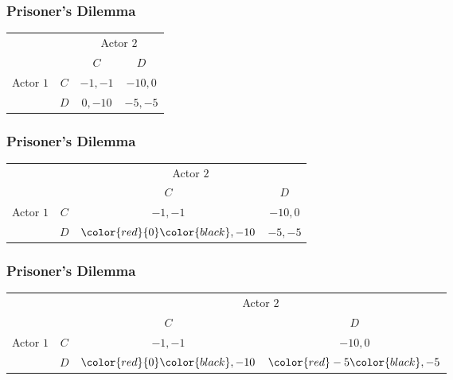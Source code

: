 \documentclass[handout]{beamer}
\begin{document}
 \begin{frame} 
 \frametitle{\LARGE{Prisoner's Dilemma}}
  \begin{table}
  	\LARGE
 	\begin{tabular}{cc|c|c|}
 		& \multicolumn{1}{c}{} & \multicolumn{2}{c}{Actor $2$}\\
 		& \multicolumn{1}{c}{} & \multicolumn{1}{c}{$C$}  & \multicolumn{1}{c}{$D$} \\\cline{3-4}
 		{Actor $1$}  & $C$ & $-1,-1$ & $-10,0$ \\\cline{3-4}
 		& $D$ & $0,-10$ & $-5,-5$ \\\cline{3-4}
 	\end{tabular}
 \end{table}
 \end{frame}


 \begin{frame} 
 \frametitle{\LARGE{Prisoner's Dilemma}}
 \begin{table}
 	\LARGE
 	\begin{tabular}{cc|c|c|}
 		& \multicolumn{1}{c}{} & \multicolumn{2}{c}{Actor $2$}\\
 		& \multicolumn{1}{c}{} & \multicolumn{1}{c}{$C$}  & \multicolumn{1}{c}{$D$} \\\cline{3-4}
 	{Actor $1$}  & $C$ & $-1,-1$ & $-10,0$ \\\cline{3-4}
 		& $D$ & $\color{red}{0}\color{black},-10$ & $-5,-5$ \\\cline{3-4}
 	\end{tabular}
 \end{table}
 \end{frame}

 \begin{frame} 
 \frametitle{\LARGE{Prisoner's Dilemma}}
 \begin{table}
 \LARGE
 \begin{tabular}{cc|c|c|}
 & \multicolumn{1}{c}{} & \multicolumn{2}{c}{Actor $2$}\\
 & \multicolumn{1}{c}{} & \multicolumn{1}{c}{$C$}  & \multicolumn{1}{c}{$D$} \\\cline{3-4}
 {Actor $1$}  & $C$ & $-1,-1$ & $-10,0$ \\\cline{3-4}
 & $D$ & $\color{red}{0}\color{black},-10$ & $\color{red}-5\color{black},-5$ \\\cline{3-4}
 \end{tabular}
 \end{table}
 \end{frame}
\end{document}
